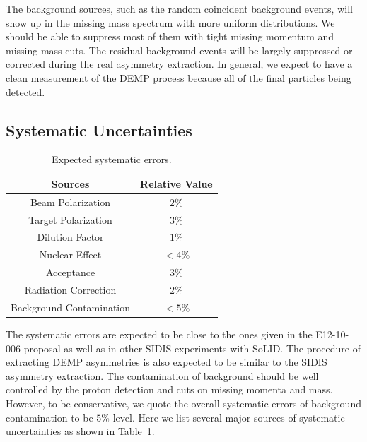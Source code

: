 The background sources, such as the random coincident background events, will
show up in the missing mass spectrum with more uniform distributions. We should
be able to suppress most of them with tight missing momentum and missing mass
cuts.  The residual background events will be largely suppressed or corrected
during the real asymmetry extraction. In general, we expect to have a clean
measurement of the DEMP process because all of the final particles being
detected.

\subsection{Systematic Uncertainties}

\begin{table}[!htp]
\centering
\begin{tabular}{|c|c|}
\hline
{\bf Sources}            & {\bf Relative Value} \\\hline
Beam Polarization        & $2\%$ \\\hline 
Target Polarization      & $3\%$ \\\hline 
Dilution Factor          & $1\%$ \\\hline 
Nuclear Effect           & $<4\%$ \\\hline 
Acceptance               & $3\%$ \\\hline
Radiation Correction     & $2\%$ \\\hline
Background Contamination & $<5\%$ \\\hline
\end{tabular}
\caption{\footnotesize{Expected systematic errors.}}\label{table:det_sys_err}
\end{table}

The systematic errors are expected to be close to the ones given in the
E12-10-006 proposal as well as in other SIDIS experiments with SoLID. The
procedure of extracting DEMP asymmetries is also expected to be similar to the
SIDIS asymmetry extraction.  The contamination of background should be well
controlled by the proton detection and cuts on missing momenta and mass.
However, to be conservative, we quote the overall systematic errors of
background contamination to be $5\%$ level.  Here we list several major sources
of systematic uncertainties as shown in Table~\ref{table:det_sys_err}.
